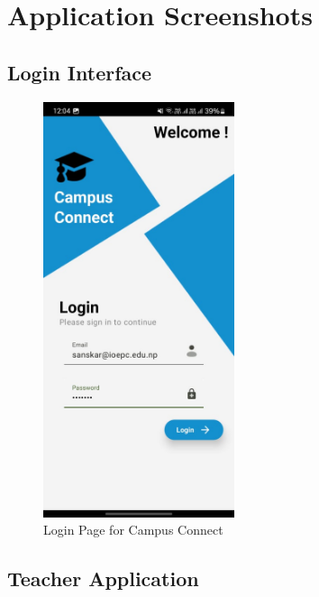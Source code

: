 \section{Application Screenshots}

\subsection{Login Interface}
\begin{figure}[H]
    \centering
    \includegraphics[width=0.5\textwidth]{Graphics/output/login_page.jpg}
    \caption{Login Page for Campus Connect}
    \label{fig:login_page}
\end{figure}

\subsection{Teacher Application}

